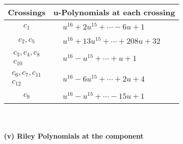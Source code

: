 \documentclass[1p]{elsarticle_modified}
\theoremstyle{definition}
\begin{document}
\begin{tabular}{m{50pt}|m{274pt}}
Crossings & \hspace{64pt}u-Polynomials at each crossing \\
\hline $$\begin{aligned}c_{1}\end{aligned}$$&$\begin{aligned}
&u^{16}+2 u^{15}+\cdots-6 u+1
\end{aligned}$\\
\hline $$\begin{aligned}c_{2},c_{5}\end{aligned}$$&$\begin{aligned}
&u^{16}+13 u^{15}+\cdots+208 u+32
\end{aligned}$\\
\hline $$\begin{aligned}c_{3},c_{4},c_{8}\\c_{10}\end{aligned}$$&$\begin{aligned}
&u^{16}- u^{15}+\cdots+u+1
\end{aligned}$\\
\hline $$\begin{aligned}c_{6},c_{7},c_{11}\\c_{12}\end{aligned}$$&$\begin{aligned}
&u^{16}-6 u^{15}+\cdots+2 u+4
\end{aligned}$\\
\hline $$\begin{aligned}c_{9}\end{aligned}$$&$\begin{aligned}
&u^{16}- u^{15}+\cdots-15 u+1
\end{aligned}$\\
\hline
\end{tabular}\\~\\
\newpage\renewcommand{\arraystretch}{1}
\flushleft \textbf{(v) Riley Polynomials at the component}\newline \\
\end{document}
